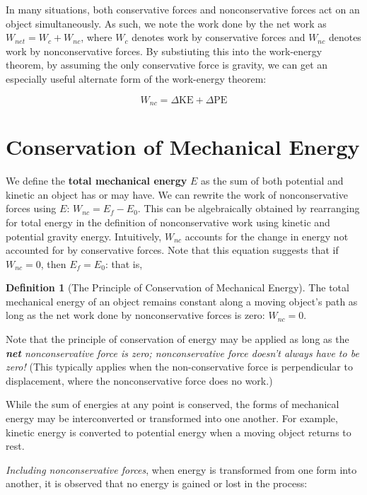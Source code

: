 \documentclass[12pt, a4paper]{article}
\theoremstyle{definition}
\newtheorem{definition}{Definition}
\begin{document}
In many situations, both conservative forces and nonconservative forces act on an object simultaneously.
As such, we note the work done by the net work as $W_{net} = W_c + W_{nc}$, where $W_c$ denotes work by conservative forces and $W_{nc}$ denotes work by nonconservative forces.
By substiuting this into the work-energy theorem, by assuming the only conservative force is gravity, we can get an especially useful alternate form of the work-energy theorem:

\[W_{nc} = \Delta \mathrm{KE} + \Delta \mathrm{PE}\]

\newpage


\section{Conservation of Mechanical Energy}
We define the \textbf{total mechanical energy} $E$ as the sum of both potential and kinetic an object has or may have.
We can rewrite the work of nonconservative forces using $E$: $W_{nc} = E_f - E_0$.
This can be algebraically obtained by rearranging for total energy in the definition of nonconservative work using kinetic and potential gravity energy.
Intuitively, $W_{nc}$ accounts for the change in energy not accounted for by conservative forces. Note that this equation suggests that if $W_{nc} = 0$, then $E_f = E_0$: that is,

\begin{definition}[The Principle of Conservation of Mechanical Energy]
    The total mechanical energy of an object remains constant along a moving object's path as long as the net work done by
    nonconservative forces is zero: $W_{nc} = 0$.
\end{definition}

Note that the principle of conservation of energy may be applied as long as the \emph{\textbf{net} nonconservative force is zero; nonconservative force doesn't always have to be zero!}
(This typically applies when the non-conservative force is perpendicular to displacement, where the nonconservative force does no work.)

While the sum of energies at any point is conserved, the forms of mechanical energy may be interconverted or transformed into one another.
For example, kinetic energy is converted to potential energy when a moving object returns to rest.

\emph{Including nonconservative forces}, when energy is transformed from one form into another, it is observed that no energy is gained or lost in the process:
\end{document}
